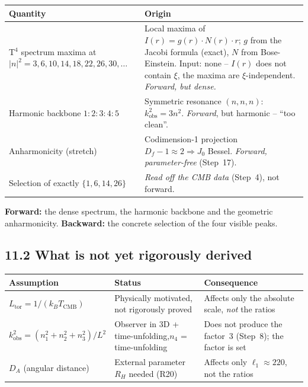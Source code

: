 \begin{center}
\begin{tabular}{p{4cm}p{8cm}}
\toprule
\textbf{Quantity} & \textbf{Origin} \\
\midrule
T$^4$ spectrum maxima at \newline $|n|^2 = 3,6,10,14,18,22,26,30,\ldots$ &
  Local maxima of $I(r) = g(r)\cdot N(r)\cdot r$;
  $g$ from the Jacobi formula (exact), $N$ from Bose-Einstein.
  Input: none -- $I(r)$ does not contain $\xi$, the maxima are $\xi$-independent. \emph{Forward, but dense.} \\
\addlinespace
Harmonic backbone $1:2:3:4:5$ &
  Symmetric resonance $(n,n,n)$: $k^2_\mathrm{obs}=3n^2$.
  \emph{Forward}, but harmonic -- ``too clean''. \\
\addlinespace
Anharmonicity (stretch) &
  Codimension-1 projection $D_f-1\approx2 \Rightarrow J_0$ Bessel.
  \emph{Forward, parameter-free} (Step~17). \\
\addlinespace
Selection of exactly $\{1,6,14,26\}$ &
  \emph{Read off the CMB data} (Step~4), not forward. \\
\bottomrule
\end{tabular}
\end{center}

\textbf{Forward:} the dense spectrum, the harmonic backbone and the geometric
anharmonicity. \textbf{Backward:} the concrete selection of the four visible
peaks.

\subsection*{11.2 What is not yet rigorously derived}

\begin{center}
\begin{tabular}{p{4cm}p{4cm}p{4cm}}
\toprule
\textbf{Assumption} & \textbf{Status} & \textbf{Consequence} \\
\midrule
$L_\mathrm{tor} = 1/(k_BT_\mathrm{CMB})$ &
  Physically motivated, not rigorously proved &
  Affects only the absolute scale, \emph{not} the ratios \\
\addlinespace
$k_\mathrm{obs}^2 = (n_1^2+n_2^2+n_3^2)/L^2$ &
  Observer in 3D + time-unfolding,\newline $n_4$ = time-unfolding &
  Does not produce the factor~3 (Step~8); the factor is set \\
\addlinespace
$D_A$ (angular distance) &
  External parameter $R_H$ needed (R20) &
  Affects only $\ell_1 \approx 220$, not the ratios \\
\bottomrule
\end{tabular}
\end{center}

